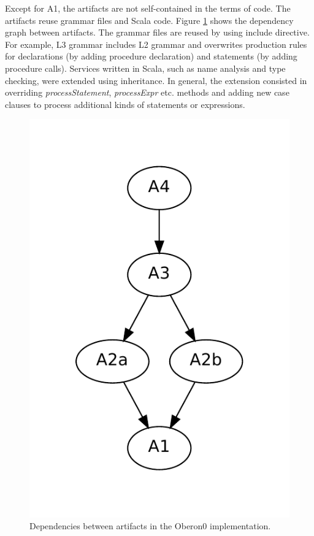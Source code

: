 Except for A1, the artifacts are not self-contained in the terms of
code. The artifacts reuse grammar files and Scala code. Figure \ref{fig:artifact-dependencies}
shows the dependency graph between artifacts. The grammar files are
reused by using include directive. For example, L3 grammar includes
L2 grammar and overwrites production rules for declarations (by adding
procedure declaration) and statements (by adding procedure calls).
Services written in Scala, such as name analysis and type checking,
were extended using inheritance. In general, the extension consisted
in overriding \emph{processStatement}, \emph{processExpr} etc. methods
and adding new case clauses to process additional kinds of statements
or expressions.

%
\begin{figure}[!h]
\noindent \begin{centering}
\includegraphics[scale=0.5]{simpl/artifacts}
\par\end{centering}

\caption{\label{fig:artifact-dependencies}Dependencies between artifacts in
the Oberon0 implementation.}

\end{figure}


